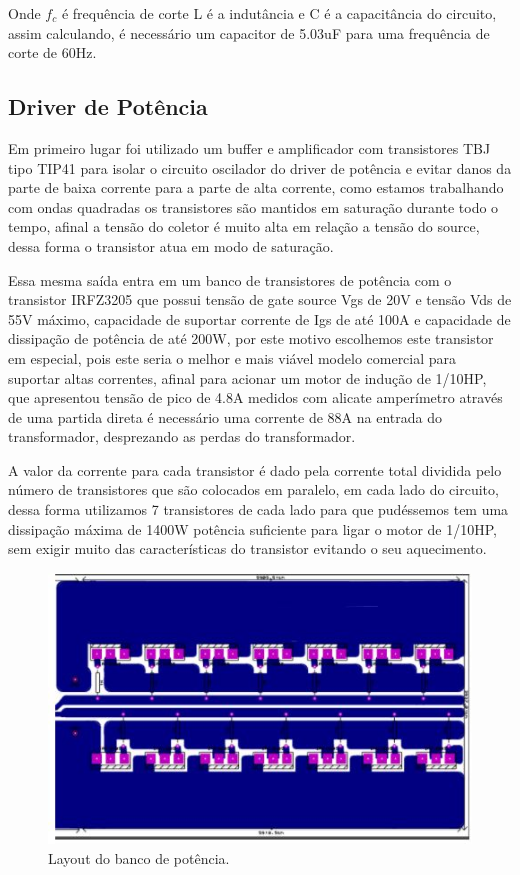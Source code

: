 	Onde $f_c$ é frequência de corte L é a indutância e C é a capacitância do circuito, assim calculando, é necessário um capacitor de 5.03uF para uma frequência de corte de 60Hz.
	
	\subsection{Driver de Potência}
	Em primeiro lugar foi utilizado um buffer e amplificador com transistores TBJ tipo TIP41 para isolar o circuito oscilador do driver de potência e evitar danos da parte de baixa corrente para a parte de alta corrente, como estamos trabalhando com ondas quadradas os transistores são mantidos em saturação durante todo o tempo, afinal a tensão do coletor é muito alta em relação a tensão do source, dessa forma o transistor atua em modo de saturação.
	
	Essa mesma saída entra em um banco de transistores de potência com o transistor IRFZ3205 que possui tensão de gate source Vgs de 20V e tensão Vds de 55V máximo, capacidade de suportar corrente de Igs de até 100A e capacidade de dissipação de potência de até 200W, por este motivo escolhemos este transistor em especial, pois este seria o melhor e mais viável modelo comercial para suportar altas correntes, afinal para acionar um motor de indução de 1/10HP, que apresentou tensão de pico de 4.8A medidos com alicate amperímetro através de uma partida direta é necessário uma corrente de 88A na entrada do transformador, desprezando as perdas do transformador.
	
	A valor da corrente para cada transistor é dado pela corrente total dividida pelo número de transistores que são colocados em paralelo, em cada lado do circuito, dessa forma utilizamos 7 transistores de cada lado para que pudéssemos tem uma dissipação máxima de 1400W potência suficiente para ligar o motor de 1/10HP, sem exigir muito das características do transistor evitando o seu aquecimento.
	
		\begin{figure}[H]
			\begin{center}
				\includegraphics[scale = 0.75]{figuras/Layout_Potencia}
				\caption{  Layout do banco de potência.}
			\end{center}
		\end{figure}
